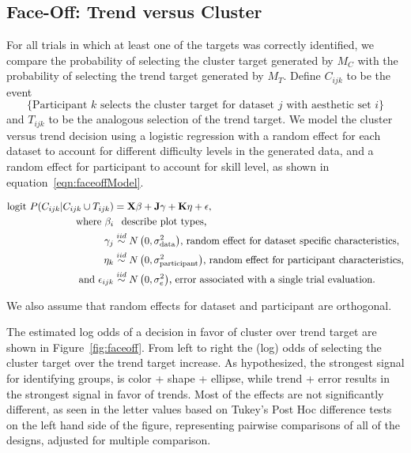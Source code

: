 \documentclass[12pt]{article}\usepackage[]{graphicx}\usepackage[]{color}
\begin{document}
\subsection{Face-Off: Trend versus Cluster}\label{sec:faceoff}
 For all trials in which at least one of the targets was correctly identified, we compare the probability of selecting the cluster target generated by $M_C$  with the probability of selecting the trend target generated by $M_T$. 
Define $C_{ijk}$ to be the event $$\{\text{Participant }k\text{ selects the cluster target for dataset }j\text{ with aesthetic set }i\}$$
and $T_{ijk}$ to be the analogous selection of the trend target.
We model the cluster versus trend decision using a logistic regression with a random effect for each dataset to account for different difficulty levels in the generated data, and a random effect for participant to account for skill level, as shown in equation~\ref{eqn:faceoffModel}. 


\begin{align}
\text{logit }P(C_{ijk} | C_{ijk}\cup T_{ijk}) & =  \textbf{X}\beta + \textbf{J}\gamma + \textbf{K}\eta + \epsilon, \label{eqn:faceoffModel}\\
\text{where } \beta_i & \hphantom{\sim} \text{describe plot types,}\nonumber\\
\hphantom{where } \gamma_j & \overset{iid}{\sim} N\left(0, \sigma^2_{\text{data}}\right)\!\text{,  random effect for dataset specific characteristics,}\nonumber\\
\hphantom{where } \eta_k & \overset{iid}{\sim} N\left(0, \sigma^2_{\text{participant}}\right)\!\text{, random effect for participant characteristics,}\nonumber\\
\text{and } \epsilon_{ijk} & \overset{iid}{\sim}  N\left(0, \sigma^2_e\right)\!\text{, error associated with a single trial evaluation.} \nonumber\end{align}

We also assume that random effects for dataset and participant are orthogonal. 

The estimated log odds of a decision in favor of cluster over trend target are shown in Figure~\ref{fig:faceoff}. From left to right the (log) odds of selecting the cluster target over the trend target increase. 
As hypothesized, the strongest signal for identifying groups, is color + shape + ellipse, while trend + error results in the strongest signal in favor of trends. 
Most of the effects are not significantly different, as seen in the letter values \citep{piepho:04} based on Tukey's Post Hoc difference tests on the left hand side of the figure, representing pairwise comparisons of all of the designs, adjusted for multiple comparison. 
\end{document}
